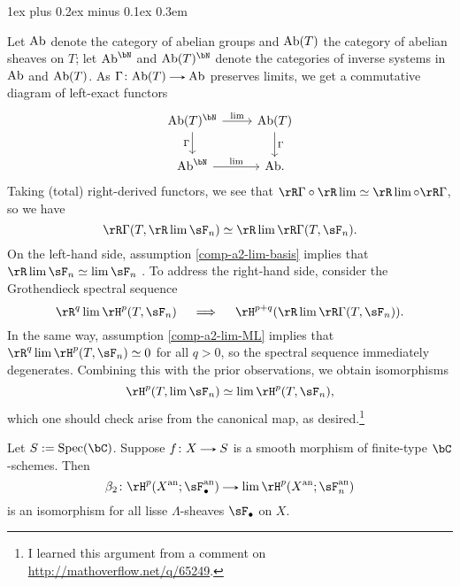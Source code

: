 \documentclass[11pt,leqno]{article}
\makeatletter
\newcommand{\thmheadfont}{\scshape}
\newcommand{\thmhorizspace}{0.3em}
\newcommand{\thmsep}{\hspace{\thmhorizspace}---}
\renewenvironment{proof}[1][Proof]{\par
  \pushQED{\qed}%
  \normalfont%
  \topsep1ex plus 0.2ex minus 0.1ex\relax%
  \labelsep \thmhorizspace\relax%
  \trivlist
  \item[\hskip\labelsep\thmheadfont#1\@addpunct{\thmsep}]\ignorespaces
}{%
  \popQED\endtrivlist\@endpefalse%
}
\theoremstyle{block}
\numberwithin{subblock}{block}
\numberwithin{equation}{subblock}
\newcommand{\arrlen}{1.25em}
\renewcommand{\to}{\mathrel{\tikz[baseline]%
    \draw[>=stealth,->](0,0.5ex)--(\arrlen,0.5ex);}}
\renewcommand{\c}{\colon}
\newcommand{\ce}{\mathrel{:=}}%
\newcommand{\iso}{\simeq}
\newcommand{\Spec}{\operatorname{Spec}}
\numberwithin{block}{section}
\makeatother
\begin{document}
\begin{nothing}
\begin{sublemma}
    \begin{proof}
      Let $\mathrm{Ab}$ denote the category of abelian groups and $\mathrm{Ab}(T)$ the category of abelian sheaves on $T$; let $\Ab^\bN$ and $\Ab(T)^\bN$ denote the categories of inverse systems in $\mathrm{Ab}$ and $\mathrm{Ab}(T)$. As $\Gamma \c \Ab(T) \to \Ab$ preserves limits, we get a commutative diagram of left-exact functors
      \[
        \begin{tikzcd}
          \Ab(T)^\bN \ar[r, "\lim"] \ar[d, "\Gamma", swap] &
          \Ab(T) \ar[d, "\Gamma"] \\
          \Ab^\bN \ar[r, "\lim"] &
          \Ab.
        \end{tikzcd}
      \]
      Taking (total) right-derived functors, we see that $\rR\Gamma \circ \rR\lim \iso \rR\lim \circ \rR\Gamma$, so we have
      \[
        \rR\Gamma(T, \rR\lim \sF_n) \iso \rR\lim \rR\Gamma(T, \sF_n).
      \]
      On the left-hand side, assumption \cref{comp-a2-lim-basis} implies that $\rR \lim \sF_n \iso \lim \sF_n$ \cite[Tag 0BKS]{stacks-project}. To address the right-hand side, consider the Grothendieck spectral sequence
      \[
        \rR^q \lim \rH^p(T, \sF_n)
        \quad \implies \quad
        \rH^{p+q}(\rR\lim \rR\Gamma(T, \sF_n)).
      \]
      In the same way, assumption \cref{comp-a2-lim-ML} implies that $\rR^q \lim \rH^p(T, \sF_n) \iso 0$ for all $q > 0$, so the spectral sequence immediately degenerates. Combining this with the prior observations, we obtain isomorphisms
      \[
        \rH^p(T, \lim \sF_n) \iso \lim \rH^p(T, \sF_n),
      \]
      which one should check arise from the canonical map, as desired.\footnote{I learned this argument from a comment on \url{http://mathoverflow.net/q/65249}.}
    \end{proof}
  \end{sublemma}

  \begin{sublemma}
    \label{comp-a2-smooth}
    Let $S \ce \Spec(\bC)$. Suppose $f \c X \to S$ is a smooth morphism of finite-type $\bC$-schemes. Then
    \[
      \beta_2 \c \rH^p(X^\an; \sF_\bullet^\an) \to \lim \rH^p(X^\an; \sF_n^\an)
    \]
    is an isomorphism for all lisse $\Lambda$-sheaves $\sF_\bullet$ on $X$.


\end{sublemma}
\end{nothing}
\end{document}
